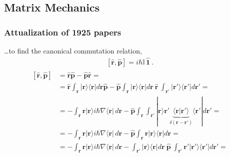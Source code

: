 \documentclass[letterpaper,10pt,english]{jupyterBook}
\begin{document}
\subsection{Matrix Mechanics}
\label{\detokenize{ch/quantum-mechanics/intro:matrix-mechanics}}

\subsubsection{Attualization of 1925 papers}
\label{\detokenize{ch/quantum-mechanics/intro:attualization-of-1925-papers}}


\sphinxAtStartPar
…to find the canonical commutation relation,
\begin{equation*}
\begin{split}[ \hat{\mathbf{r}}, \hat{\mathbf{p}} ] = i \hbar  \mathbb{I} \, \hat{\mathbf{1}} \ .\end{split}
\end{equation*}\begin{equation*}
\begin{split}\begin{aligned}
\left[ \hat{\mathbf{r}}, \hat{\mathbf{p}} \right]
 & = \hat{\mathbf{r}} \hat{\mathbf{p}} - \hat{\mathbf{p}} \hat{\mathbf{r}} = \\
 & = \hat{\mathbf{r}} \int_{\mathbf{r}} | \mathbf{r} \rangle \langle \mathbf{r} | d \mathbf{r} \hat{\mathbf{p}}
   - \hat{\mathbf{p}} \int_{\mathbf{r}} | \mathbf{r} \rangle \langle \mathbf{r} | d \mathbf{r} \ \hat{\mathbf{r}} \ \int_{\mathbf{r}'} | \mathbf{r}' \rangle \langle \mathbf{r}' | d \mathbf{r}' = \\
 & = - \int_{\mathbf{r}} \mathbf{r} | \mathbf{r} \rangle i \hbar \nabla \langle \mathbf{r} | \, d \mathbf{r} - \hat{\mathbf{p}} \int_{\mathbf{r}} \int_{\mathbf{r}'} | \mathbf{r} \rangle \mathbf{r}' \underbrace{\langle \mathbf{r} |\mathbf{r}' \rangle}_{\delta(\mathbf{r}-\mathbf{r}')} \langle \mathbf{r}' | d \mathbf{r}' = \\
 & = - \int_{\mathbf{r}} \mathbf{r} | \mathbf{r} \rangle i \hbar \nabla \langle \mathbf{r} | \, d \mathbf{r} - \hat{\mathbf{p}} \int_{\mathbf{r}} \mathbf{r} | \mathbf{r} \rangle \langle \mathbf{r} | d \mathbf{r} = \\
 & = - \int_{\mathbf{r}} \mathbf{r} | \mathbf{r} \rangle i \hbar \nabla \langle \mathbf{r} | \, d \mathbf{r} - \int_{\mathbf{r}'} | \mathbf{r} \rangle \langle \mathbf{r} | d \mathbf{r} \ \hat{\mathbf{p}} \ \int_{\mathbf{r}'} \mathbf{r}' | \mathbf{r}' \rangle \langle \mathbf{r}' | d \mathbf{r}' = \\

\end{aligned}
\end{split}
\end{equation*}
\end{document}
